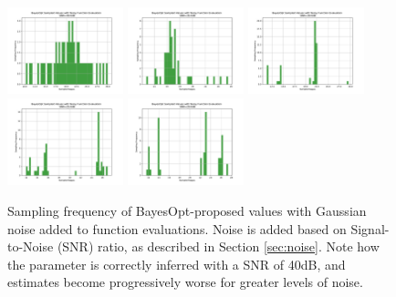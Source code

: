 \documentclass[bsc,frontabs,singlespacing,parskip,deptreport]{infthesis}
\begin{document}
\begin{figure}[htb]
    \centering
    \includegraphics[width=0.3\textwidth]{Images/Noise/Histogram_Noise_40.0.pdf}
    \includegraphics[width=0.3\textwidth]{Images/Noise/Histogram_Noise_35.0.pdf}
    \includegraphics[width=0.3\textwidth]{Images/Noise/Histogram_Noise_30.0.pdf}
    \includegraphics[width=0.3\textwidth]{Images/Noise/Histogram_Noise_25.0.pdf}
    \includegraphics[width=0.3\textwidth]{Images/Noise/Histogram_Noise_20.0.pdf}
    \caption{Sampling frequency of BayesOpt-proposed values with Gaussian noise added to function evaluations. Noise is added based on Signal-to-Noise (SNR) ratio, as described in Section \ref{sec:noise}. Note how the parameter is correctly inferred with a SNR of 40dB, and estimates become progressively worse for greater levels of noise. }
    \label{fig:noise_histograms}
\end{figure}
\end{document}
